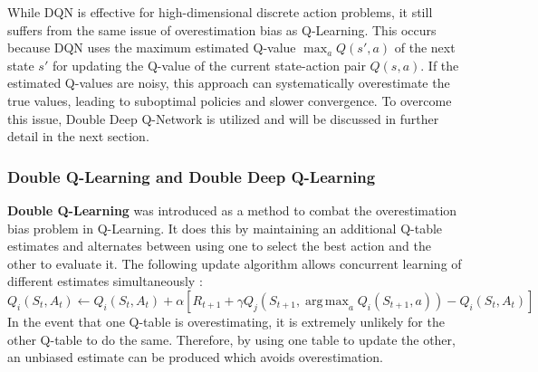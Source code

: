 \documentclass{article}
\DeclareMathOperator*{\argmax}{arg\,max}
\begin{document}
While DQN is effective for high-dimensional discrete action problems, it still suffers from the same issue of overestimation bias as Q-Learning. This occurs because DQN uses the maximum estimated Q-value \( \max_{a} Q(s', a) \) of the next state \( s' \) for updating the Q-value of the current state-action pair \( Q(s, a) \). If the estimated Q-values are noisy, this approach can systematically overestimate the true values, leading to suboptimal policies and slower convergence. To overcome this issue, Double Deep Q-Network is utilized and will be discussed in further detail in the next section.


\subsubsection{Double Q-Learning and Double Deep Q-Learning} \label{sec: DDQ_learn}
\textbf{Double Q-Learning} \cite{van2010double} was introduced as a method to combat the overestimation bias problem in Q-Learning.
It does this by maintaining an additional Q-table estimates and alternates between using one to select the best action and the other to evaluate it. The following update algorithm allows concurrent learning of different estimates simultaneously \cite{sutton1998reinforcement}:
\[
Q_i(S_t, A_t) \leftarrow Q_i(S_t, A_t) + \alpha[R_{t+1} + \gamma Q_j(S_{t+1}, \argmax_{a} Q_i(S_{t+1}, a)) - Q_i(S_t, A_t)]
\]
In the event that one Q-table is overestimating, it is extremely unlikely for the other Q-table to do the same. Therefore, by using one table to update the other, an unbiased estimate can be produced which avoids overestimation.
\end{document}
